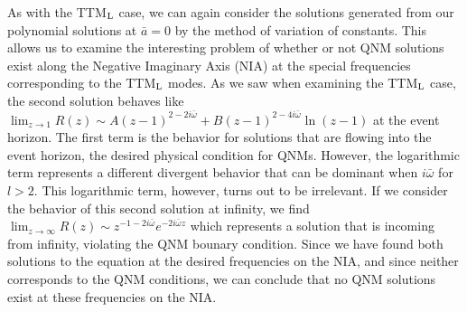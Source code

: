 \documentclass[11pt]{article}
\begin{document}
As with the TTM${}_{\rm L}$ case, we can again consider the solutions
generated from our polynomial solutions at $\bar{a}=0$ by the method
of variation of constants.  This allows us to examine the interesting
problem of whether or not QNM solutions exist along the Negative
Imaginary Axis (NIA) at the special frequencies corresponding to the
TTM${}_{\rm L}$ modes.  As we saw when examining the TTM${}_{\rm L}$
case, the second solution behaves like $\lim_{z\to1}R(z)\sim
A(z-1)^{2-2i\bar\omega}+B(z-1)^{2-4i\bar\omega}\ln(z-1)$ at the event
horizon.  The first term is the behavior for solutions that are
flowing into the event horizon, the desired physical condition for
QNMs.  However, the logarithmic term represents a different divergent
behavior that can be dominant when $i\bar\omega$ for $l>2$.  This
logarithmic term, however, turns out to be irrelevant.  If we consider
the behavior of this second solution at infinity, we find
$\lim_{z\to\infty}R(z)\sim z^{-1-2i\bar\omega}e^{-2i\bar\omega z}$
which represents a solution that is incoming from infinity, violating
the QNM bounary condition.  Since we have found both solutions
to the equation at the desired frequencies on the NIA, and since 
neither corresponds to the QNM conditions, we can conclude that
no QNM solutions exist at these frequencies on the NIA.
\end{document}

